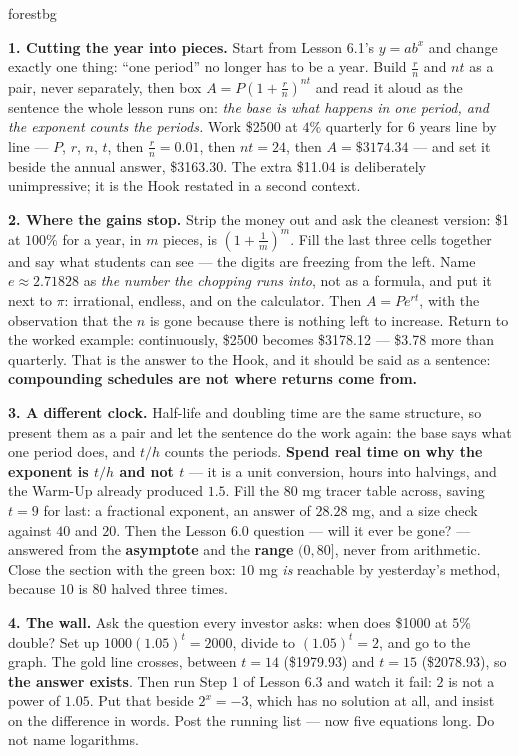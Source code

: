 \documentclass[10pt]{article}
\begin{document}
\begin{skillbox}[Lesson]{forestbg}
\begin{multicols}{2}
\textbf{1. Cutting the year into pieces.} Start from Lesson 6.1's $y=ab^{x}$ and change exactly one
thing: ``one period'' no longer has to be a year. Build $\frac{r}{n}$ and $nt$ as a pair, never
separately, then box $A=P\left(1+\frac{r}{n}\right)^{nt}$ and read it aloud as the sentence the whole
lesson runs on: \emph{the base is what happens in one period, and the exponent counts the periods.}
Work \$2500 at $4\%$ quarterly for 6 years line by line --- $P$, $r$, $n$, $t$, then $\frac{r}{n}=0.01$,
then $nt=24$, then $A=\$3174.34$ --- and set it beside the annual answer, \$3163.30. The extra \$11.04
is deliberately unimpressive; it is the Hook restated in a second context.

\textbf{2. Where the gains stop.} Strip the money out and ask the cleanest version: \$1 at $100\%$ for
a year, in $m$ pieces, is $\left(1+\frac1m\right)^{m}$. Fill the last three cells together and say what
students can see --- the digits are freezing from the left. Name $e\approx2.71828$ as \emph{the number
the chopping runs into}, not as a formula, and put it next to $\pi$: irrational, endless, and on the
calculator. Then $A=Pe^{rt}$, with the observation that the $n$ is gone because there is nothing left to
increase. Return to the worked example: continuously, \$2500 becomes \$3178.12 --- \$3.78 more than
quarterly. That is the answer to the Hook, and it should be said as a sentence: \textbf{compounding
schedules are not where returns come from.}

\columnbreak

\textbf{3. A different clock.} Half-life and doubling time are the same structure, so present them as
a pair and let the sentence do the work again: the base says what one period does, and $t/h$ counts the
periods. \textbf{Spend real time on why the exponent is $t/h$ and not $t$} --- it is a unit conversion,
hours into halvings, and the Warm-Up already produced $1.5$. Fill the 80 mg tracer table across, saving
$t=9$ for last: a fractional exponent, an answer of $28.28$ mg, and a size check against $40$ and $20$.
Then the Lesson 6.0 question --- will it ever be gone? --- answered from the \textbf{asymptote} and the
\textbf{range} $(0,80]$, never from arithmetic. Close the section with the green box: $10$ mg \emph{is}
reachable by yesterday's method, because $10$ is $80$ halved three times.

\textbf{4. The wall.} Ask the question every investor asks: when does \$1000 at $5\%$ double? Set up
$1000(1.05)^{t}=2000$, divide to $(1.05)^{t}=2$, and go to the graph. The gold line crosses, between
$t=14$ (\$1979.93) and $t=15$ (\$2078.93), so \textbf{the answer exists}. Then run Step 1 of Lesson 6.3
and watch it fail: $2$ is not a power of $1.05$. Put that beside $2^{x}=-3$, which has no solution at
all, and insist on the difference in words. Post the running list --- now five equations long. Do not
name logarithms.
\end{multicols}
\end{skillbox}
\end{document}

